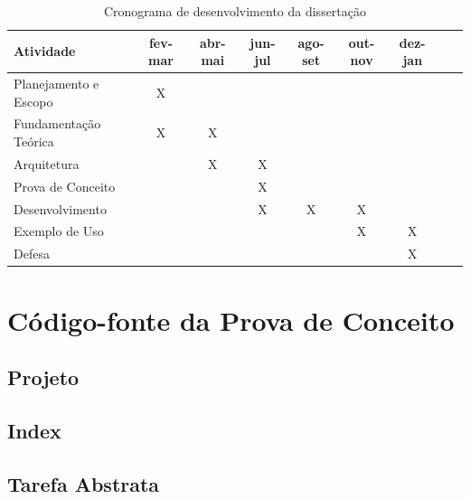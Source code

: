 \documentclass[12pt]{tcc}
\begin{document}
\begin{table}[!ht]
	\centering
	\caption{Cronograma de desenvolvimento da dissertação}
	\begin{tabular}{l  c  c  c  c  c  c L{1.5cm} R{1.5cm}}
		\toprule
		\textbf{Atividade} & \textbf{fev-mar} & \textbf{abr-mai} & \textbf{jun-jul} & \textbf{ago-set} & \textbf{out-nov} & \textbf{dez-jan} \\
		\midrule
		Planejamento e Escopo  &  X  &    &    &    &    &    \\
		Fundamentação Teórica  &  X  &  X  &    &    &    &    \\
		Arquitetura  &    &  X  &  X  &    &    &    \\
		Prova de Conceito  &    &    &  X  &    &    &    \\
		Desenvolvimento  &    &    &  X  &  X  &  X  &    \\
		Exemplo de Uso  &    &    &    &    &  X  &  X  \\
		Defesa  &    &    &    &    &    &  X  \\
		\bottomrule
	\end{tabular}
	\label{tab:cronograma}
\end{table}

\label{bibpage}
\renewcommand\bibname{Referências}

%

\label{bibfinalpage}

\label{lastpage}

\appendix
\chapter{Código-fonte da Prova de Conceito}

\section{Projeto}


\section{Index}


\section{Tarefa Abstrata}

\end{document}
